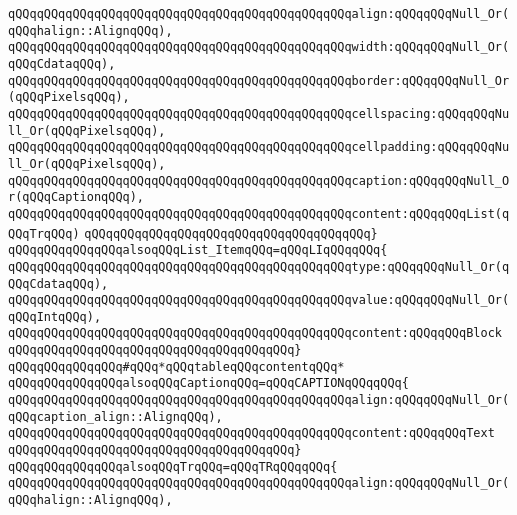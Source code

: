\verb|qQQqqQQqqQQqqQQqqQQqqQQqqQQqqQQqqQQqqQQqqQQqqQQqalign:qQQqqQQqNull_Or(qQQqhalign::AlignqQQq),|\newline
\verb|qQQqqQQqqQQqqQQqqQQqqQQqqQQqqQQqqQQqqQQqqQQqqQQqwidth:qQQqqQQqNull_Or(qQQqCdataqQQq),|\newline
\verb|qQQqqQQqqQQqqQQqqQQqqQQqqQQqqQQqqQQqqQQqqQQqqQQqborder:qQQqqQQqNull_Or(qQQqPixelsqQQq),|\newline
\verb|qQQqqQQqqQQqqQQqqQQqqQQqqQQqqQQqqQQqqQQqqQQqqQQqcellspacing:qQQqqQQqNull_Or(qQQqPixelsqQQq),|\newline
\verb|qQQqqQQqqQQqqQQqqQQqqQQqqQQqqQQqqQQqqQQqqQQqqQQqcellpadding:qQQqqQQqNull_Or(qQQqPixelsqQQq),|\newline
\verb|qQQqqQQqqQQqqQQqqQQqqQQqqQQqqQQqqQQqqQQqqQQqqQQqcaption:qQQqqQQqNull_Or(qQQqCaptionqQQq),|\newline
\verb|qQQqqQQqqQQqqQQqqQQqqQQqqQQqqQQqqQQqqQQqqQQqqQQqcontent:qQQqqQQqList(qQQqTrqQQq)|\newline
\verb|qQQqqQQqqQQqqQQqqQQqqQQqqQQqqQQqqQQqqQQq}|\newline
\newline
\verb|qQQqqQQqqQQqqQQqalsoqQQqList_ItemqQQq=qQQqLIqQQqqQQq{|\newline
\verb|qQQqqQQqqQQqqQQqqQQqqQQqqQQqqQQqqQQqqQQqqQQqqQQqtype:qQQqqQQqNull_Or(qQQqCdataqQQq),|\newline
\verb|qQQqqQQqqQQqqQQqqQQqqQQqqQQqqQQqqQQqqQQqqQQqqQQqvalue:qQQqqQQqNull_Or(qQQqIntqQQq),|\newline
\verb|qQQqqQQqqQQqqQQqqQQqqQQqqQQqqQQqqQQqqQQqqQQqqQQqcontent:qQQqqQQqBlock|\newline
\verb|qQQqqQQqqQQqqQQqqQQqqQQqqQQqqQQqqQQqqQQq}|\newline
\newline
\verb|qQQqqQQqqQQqqQQq#qQQq*qQQqtableqQQqcontentqQQq*|\newline
\verb|qQQqqQQqqQQqqQQqalsoqQQqCaptionqQQq=qQQqCAPTIONqQQqqQQq{|\newline
\verb|qQQqqQQqqQQqqQQqqQQqqQQqqQQqqQQqqQQqqQQqqQQqqQQqalign:qQQqqQQqNull_Or(qQQqcaption_align::AlignqQQq),|\newline
\verb|qQQqqQQqqQQqqQQqqQQqqQQqqQQqqQQqqQQqqQQqqQQqqQQqcontent:qQQqqQQqText|\newline
\verb|qQQqqQQqqQQqqQQqqQQqqQQqqQQqqQQqqQQqqQQq}|\newline
\verb|qQQqqQQqqQQqqQQqalsoqQQqTrqQQq=qQQqTRqQQqqQQq{|\newline
\verb|qQQqqQQqqQQqqQQqqQQqqQQqqQQqqQQqqQQqqQQqqQQqqQQqalign:qQQqqQQqNull_Or(qQQqhalign::AlignqQQq),|\newline
